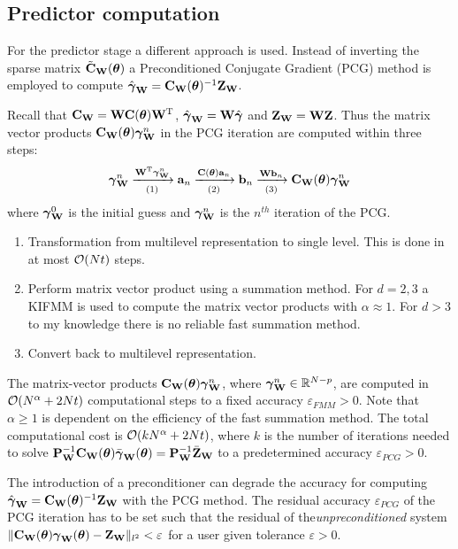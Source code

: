 \documentclass[11pt,final]{amsart}       %
\begin{document}
\subsection{Predictor computation}
\label{comppred}

For the predictor stage a different approach is used. Instead of
inverting the sparse matrix $\tilde {\mathbf{C}}_{\mathbf{W}}(\boldsymbol{\theta})$ a
Preconditioned Conjugate Gradient (PCG) method is employed to compute
$\hat {\boldsymbol{\gamma}}_{\mathbf{W}} = \mathbf{C}_{\mathbf{W}}(\boldsymbol{\theta})^{-1} \mathbf{Z}_{\mathbf{W}}$.

Recall that $\mathbf{C}_{\mathbf{W}} = \mathbf{W} \mathbf{C}(\boldsymbol{\theta}) \mathbf{W} ^{\rm T}$, $\hat {\boldsymbol{\gamma}}_{\mathbf{W}} =
\mathbf{W} \hat {\boldsymbol{\gamma}}$ and $\mathbf{Z}_{\mathbf{W}} = \mathbf{W} \mathbf{Z}$. Thus the matrix vector
products $\mathbf{C}_{\mathbf{W}}(\boldsymbol{\theta}) \boldsymbol{\gamma}_{\mathbf{W}}^n$ in the PCG iteration are computed
within three steps:
\[
\boldsymbol{\gamma}_{\mathbf{W}}^n \xrightarrow[(1)]{\mathbf{W} ^{\rm T} \boldsymbol{\gamma}_{\mathbf{W}}^n} 
\mathbf{a}_n \xrightarrow[(2)]{\mathbf{C}(\boldsymbol{\theta}) \mathbf{a}_n}
\mathbf{b}_n \xrightarrow[(3)]{\mathbf{W} \mathbf{b}_n}
\mathbf{C}_{\mathbf{W}}(\boldsymbol{\theta}) \boldsymbol{\gamma}_{\mathbf{W}}^n 
\]
where $\boldsymbol{\gamma}_{\mathbf{W}}^0$ is the initial guess and $\boldsymbol{\gamma}_{\mathbf{W}}^n$ is the $n^{th}$
iteration of the PCG.
\begin{enumerate}[(1)]

\item Transformation from multilevel representation to single
  level. This is done in at most ${\mathcal O}(Nt)$ steps.

\item Perform matrix vector product using a summation method. For $d =
  2,3$ a KIFMM is used to compute the matrix vector products with
  $\alpha \approx 1$. For $d > 3$ to my knowledge there is no reliable
  fast summation method.

\item Convert back to multilevel representation.

\end{enumerate}

The matrix-vector products $\mathbf{C}_{\mathbf{W}}(\boldsymbol{\theta}) \boldsymbol{\gamma}_{\mathbf{W}}^n$, where
$\boldsymbol{\gamma}_{\mathbf{W}}^n \in \Bbb{R}^{N-p}$, are computed in ${\mathcal O}(N^{\alpha} + 2
Nt)$ computational steps to a fixed accuracy $\varepsilon_{FMM} > 0$.
Note that $\alpha \geq 1$ is dependent on the efficiency of the fast
summation method. The total computational cost is ${\mathcal O}(kN^{\alpha} +
2Nt)$, where $k$ is the number of iterations needed to solve
$\mathbf{P}^{-1}_{\mathbf{W}} \mathbf{C}_{\mathbf{W}}(\boldsymbol{\theta}) \bar{\boldsymbol{\gamma}}_{\mathbf{W}} (\boldsymbol{\theta}) =
\mathbf{P}^{-1}_{\mathbf{W}} \bar{\mathbf{Z}}_{\mathbf{W}}$ to a predetermined accuracy
$\varepsilon_{PCG} > 0$.

\begin{remark}
The introduction of a preconditioner can degrade the accuracy for
computing $\hat {\boldsymbol{\gamma}}_{\mathbf{W}} = \mathbf{C}_{\mathbf{W}}(\boldsymbol{\theta})^{-1} \mathbf{Z}_{\mathbf{W}}$
with the PCG method. The residual accuracy $\varepsilon_{PCG}$ of the
PCG iteration has to be set such that the residual of
the\emph{unpreconditioned} system $\|\mathbf{C}_{\mathbf{W}}(\boldsymbol{\theta}) \boldsymbol{\gamma}_{\mathbf{W}}
(\boldsymbol{\theta}) - \mathbf{Z}_{\mathbf{W}}\|_{l^2} < \varepsilon$ for a user given
tolerance $\varepsilon > 0$.
\end{remark}
\end{document}
